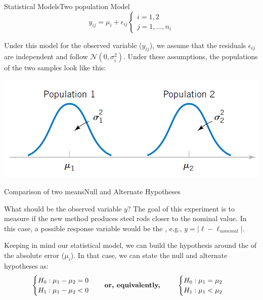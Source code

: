 \begin{frame}{Statistical Models}{Two population Model}
  \begin{equation*}
    y_{ij} = \mu_i + \epsilon_{ij}\begin{cases}i=1,2\\j=1,\ldots,n_i\end{cases}
  \end{equation*}\medskip

  Under this model for the observed variable ($y_{ij}$), we assume that the residuals $\epsilon_{ij}$ are independent and follow $\mathcal{N}\left(0,\sigma_i^2\right)$. Under these assumptions, the populations of the two samples look like this:

  \begin{center}
    \includegraphics[width=.5\textwidth]{../img/two_population_model}
  \end{center}
\end{frame}

\begin{frame}{Comparison of two means}{Null and Alternate Hypotheses}

What should be the observed variable $y$? The goal of this experiment is to measure if the new method produces steel rods closer to the nominal value. In this case, a possible response variable would be the , e.g., $y = |\ell - \ell_{nominal}|$.\bigskip

Keeping in mind our statistical model, we can build the hypothesis around the  of the absolute error ($\mu_i$). In that case, we can state the null and alternate hypotheses as:
\begin{equation*}
\begin{cases}
H_0: \mu_1 - \mu_2 = 0\\
H_1: \mu_1 - \mu_2 < 0
\end{cases}\ \ \ \mbox{\textbf{or, equivalently, }}\ \ \ \ \ \ \begin{cases}
H_0: \mu_1 = \mu_2\\
H_1: \mu_1 < \mu_2
\end{cases}
\end{equation*}
\medskip
\end{frame}



